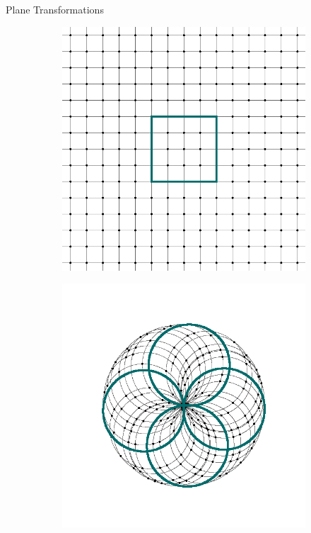 \documentclass[final]{beamer}
\newlength{\colwidth}
\begin{document}
\begin{frame}[t]
\begin{columns}[t]
\begin{column}{\colwidth}
\begin{block}{Plane Transformations}
  \begin{figure}[H]
   \centering
   \begin{subfigure}[c]{.2\textwidth}
    \centering
    \includegraphics[width=\textwidth]{grid.png}
   \end{subfigure}
   \begin{subfigure}[c]{.1\textwidth}
    \centering
   \end{subfigure}
   \begin{subfigure}[c]{.2\textwidth}
    \centering
    \includegraphics[width=\textwidth]{transformed_grid_1.png}

\end{subfigure}
\end{figure}
\end{block}
\end{column}
\end{columns}
\end{frame}
\end{document}
